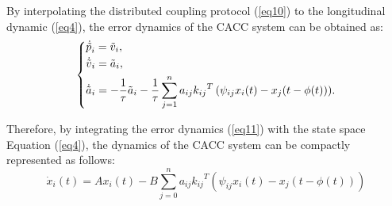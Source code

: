 \documentclass[a4paper]{cas-sc}
\begin{document}
By interpolating the distributed coupling protocol (\ref{eq10}) to the longitudinal dynamic (\ref{eq4}), the error dynamics of the CACC system can be obtained as:
\begin{equation}
  \left\{ \begin{gathered}
    {{\dot {\tilde p}}_i} = {{\tilde v}_i}, \hfill \\
    {{\dot {\tilde v}}_i} = {{\tilde a}_i}, \hfill\\
    {{\dot {\tilde a}}_i} =  - \frac{1}{\tau }{{\tilde a}_i} - \frac{1}{\tau }\sum\limits_{j = 1}^n {{a_{ij}}{k_{ij}}^T\left( {{\psi _{ij}}{x_i}(t) - {x_j}(t - \phi(t))} \right)}.  \hfill \\
  \end{gathered}  \right.
\label{eq11}
\end{equation}

Therefore, by integrating the error dynamics (\ref{eq11}) with the state space Equation (\ref{eq4}), the dynamics of the CACC system can be compactly represented as follows:
\begin{equation}
{\dot{x}}_i\left(t\right)=Ax_i\left(t\right)-B\sum_{j=0}^{n}{a_{ij}{k_{ij}}^T\left(\psi_{ij}x_i(t)-x_j(t-\phi(t))\right)}
\label{eq12}
\end{equation}
\end{document}
